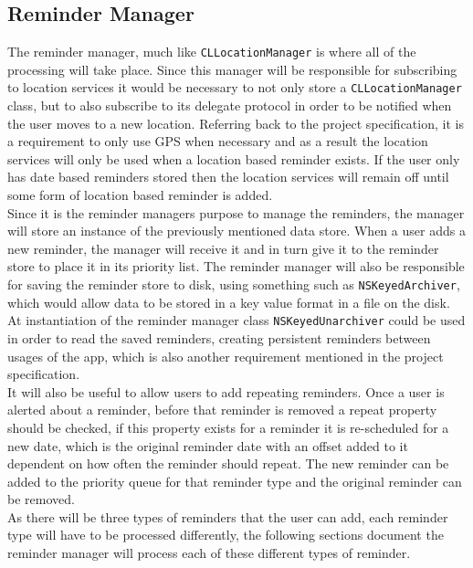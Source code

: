 \documentclass[12pt]{report}
\begin{document}
\subsection{Reminder Manager}

The reminder manager, much like \texttt{CLLocationManager} is where all of the processing will take place. Since this manager will be responsible for subscribing to location services it would be necessary to not only store a \texttt{CLLocationManager} class, but to also subscribe to its delegate protocol in order to be notified when the user moves to a new location. Referring back to the project specification, it is a requirement to only use GPS when necessary and as a result the location services will only be used when a location based reminder exists. If the user only has date based reminders stored then the location services will remain off until some form of location based reminder is added.\\

Since it is the reminder managers purpose to manage the reminders, the manager will store an instance of the previously mentioned data store. When a user adds a new reminder, the manager will receive it and in turn give it to the reminder store to place it in its priority list. The reminder manager will also be responsible for saving the reminder store to disk, using something such as \texttt{NSKeyedArchiver}, which would allow data to be stored in a key value format in a file on the disk. At instantiation of the reminder manager class \texttt{NSKeyedUnarchiver} could be used in order to read the saved reminders, creating persistent reminders between usages of the app, which is also another requirement mentioned in the project specification.\\

It will also be useful to allow users to add repeating reminders. Once a user is alerted about a reminder, before that reminder is removed a repeat property should be checked, if this property exists for a reminder it is re-scheduled for a new date, which is the original reminder date with an offset added to it dependent on how often the reminder should repeat. The new reminder can be added to the priority queue for that reminder type and the original reminder can be removed.\\

As there will be three types of reminders that the user can add, each reminder type will have to be processed differently, the following sections document the reminder manager will process each of these different types of reminder.
\end{document}
